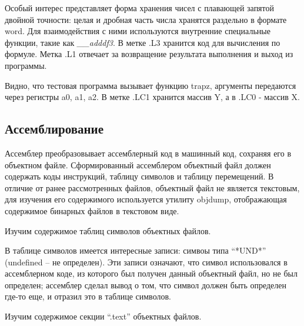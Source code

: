 
\parindent=1cm

Особый интерес представляет форма хранения чисел с плавающей запятой двойной точности: целая и дробная часть числа хранятся раздельно в формате word. Для взаимодействия с ними используются внутренние специальные функции, такие как \textit{\_\_adddf3}. В метке .L3 хранится код для вычисления по формуле. Метка .L1 отвечает за возвращение результата выполнения и выход из программы. 
\newline
\newline


\parindent=1cm

Видно, что тестовая программа вызывает функцию trapz, аргументы передаются через регистры a0, a1, a2. В метке .LC1 хранится массив Y, а в .LC0 - массив X.

\subsection{Ассемблирование}
Ассемблер преобразовывает ассемблерный код в машинный код, сохраняя его в объектном файле. Сформированный ассемблером объектный файл должен содержать коды инструкций, таблицу символов и таблицу перемещений. В отличие от ранее рассмотренных файлов, объектный файл не является текстовым, для изучения его содержимого используется утилиту objdump, отображающая содержимое бинарных файлов в текстовом виде.

Изучим содержимое таблиц символов объектных файлов.

\parindent=1cm


\parindent=1cm

В таблице символов  имеется интересные записи: симвоы типа “*UND*” (undefined – не определен).
Эти записи означают, что символ использовался в ассемблерном коде, из которого был
получен данный объектный файл, но не был определен; ассемблер сделал вывод о том, что
символ должен быть определен где-то еще, и отразил это в таблице символов.

Изучим содержимое секции “.text” объектных файлов.


\parindent=1cm

